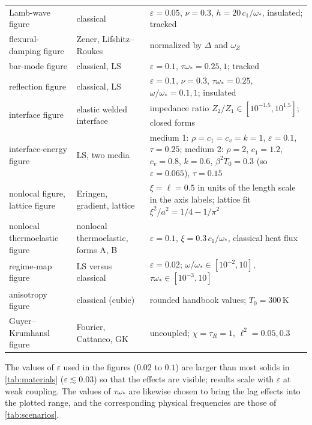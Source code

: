 \begin{table}[H]
\begin{tabularx}{\textwidth}{@{}p{4.0cm}p{3.0cm}X@{}}
Lamb-wave figure & classical & $\varepsilon=0.05$, $\nu=0.3$, $h=20\,c_1/\omega_*$, insulated; tracked\\
flexural-damping figure & Zener, Lifshitz--Roukes & normalized by $\Delta$ and $\omega_Z$\\
bar-mode figure & classical, LS & $\varepsilon=0.1$, $\tau\omega_*=0.25,1$; tracked\\
reflection figure & classical, LS & $\varepsilon=0.1$, $\nu=0.3$, $\tau\omega_*=0.25$, $\omega/\omega_*=0.1,1$; insulated\\
interface figure & elastic welded interface & impedance ratio $Z_2/Z_1\in[10^{-1.5},10^{1.5}]$; closed forms\\
interface-energy figure & LS, two media & medium 1: $\rho=c_1=c_v=k=1$, $\varepsilon=0.1$, $\tau=0.25$; medium 2: $\rho=2$, $c_1=1.2$, $c_v=0.8$, $k=0.6$, $\beta^2T_0=0.3$ (so $\varepsilon=0.065$), $\tau=0.15$\\
nonlocal figure, lattice figure & Eringen, gradient, lattice & $\xi=\ell=0.5$ in units of the length scale in the axis labels; lattice fit $\xi^2/a^2=1/4-1/\pi^2$\\
nonlocal thermoelastic figure & nonlocal thermoelastic, forms A, B & $\varepsilon=0.1$, $\xi=0.3\,c_1/\omega_*$, classical heat flux\\
regime-map figure & LS versus classical & $\varepsilon=0.02$; $\omega/\omega_*\in[10^{-2},10]$, $\tau\omega_*\in[10^{-3},10]$\\
anisotropy figure & classical (cubic) & rounded handbook values; $T_0=300$\,K\\
Guyer--Krumhansl figure & Fourier, Cattaneo, GK & uncoupled; $\chi=\tau_R=1$, $\ell^2=0.05,0.3$\\
\bottomrule\end{tabularx}
\end{table}

The values of $\varepsilon$ used in the figures ($0.02$ to $0.1$) are larger than most solids in \cref{tab:materials} ($\varepsilon\lesssim0.03$) so that the effects are visible; results scale with $\varepsilon$ at weak coupling. The values of $\tau\omega_*$ are likewise chosen to bring the lag effects into the plotted range, and the corresponding physical frequencies are those of \cref{tab:scenarios}.
